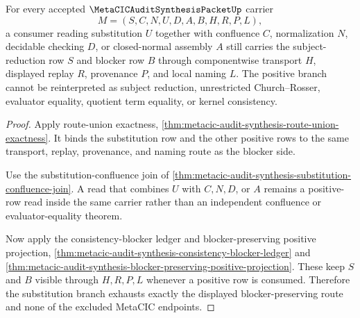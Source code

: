 \begin{theorem}
\label{thm:metacic-audit-synthesis-substitution-blocker-exhaustion}
For every accepted $\MetaCICAuditSynthesisPacketUp$ carrier
$$
M=(S,C,N,U,D,A,B,H,R,P,L),
$$
a consumer reading substitution $U$ together with confluence $C$, normalization $N$, decidable checking $D$, or closed-normal assembly $A$ still carries the subject-reduction row $S$ and blocker row $B$ through componentwise transport $H$, displayed replay $R$, provenance $P$, and local naming $L$. The positive branch cannot be reinterpreted as subject reduction, unrestricted Church--Rosser, evaluator equality, quotient term equality, or kernel consistency.
\end{theorem}
\begin{proof}
Apply route-union exactness, \autoref{thm:metacic-audit-synthesis-route-union-exactness}. It binds the substitution row and the other positive rows to the same transport, replay, provenance, and naming route as the blocker side.

Use the substitution-confluence join of \autoref{thm:metacic-audit-synthesis-substitution-confluence-join}. A read that combines $U$ with $C,N,D$, or $A$ remains a positive-row read inside the same carrier rather than an independent confluence or evaluator-equality theorem.

Now apply the consistency-blocker ledger and blocker-preserving positive projection, \autoref{thm:metacic-audit-synthesis-consistency-blocker-ledger} and \autoref{thm:metacic-audit-synthesis-blocker-preserving-positive-projection}. These keep $S$ and $B$ visible through $H,R,P,L$ whenever a positive row is consumed. Therefore the substitution branch exhausts exactly the displayed blocker-preserving route and none of the excluded MetaCIC endpoints.
\end{proof}

